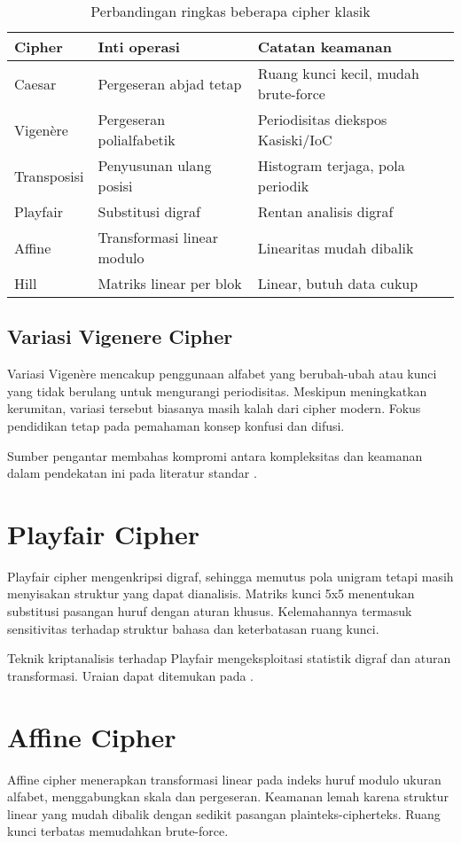 \documentclass[../main.tex]{subfiles}
\begin{document}
\begin{table}[h]
\centering
\caption{Perbandingan ringkas beberapa cipher klasik}
\label{tab:klasik}
\begin{tabular}{lll}
\toprule
Cipher & Inti operasi & Catatan keamanan \\
\midrule
Caesar & Pergeseran abjad tetap & Ruang kunci kecil, mudah brute-force \\
Vigenère & Pergeseran polialfabetik & Periodisitas diekspos Kasiski/IoC \parencite{friedman1922ioc} \\
Transposisi & Penyusunan ulang posisi & Histogram terjaga, pola periodik \\
Playfair & Substitusi digraf & Rentan analisis digraf \\
Affine & Transformasi linear modulo & Linearitas mudah dibalik \\
Hill & Matriks linear per blok & Linear, butuh data cukup \\
\bottomrule
\end{tabular}
\end{table}

\subsection{Variasi Vigenere Cipher}
Variasi Vigenère mencakup penggunaan alfabet yang berubah-ubah atau kunci yang tidak berulang untuk mengurangi periodisitas. Meskipun meningkatkan kerumitan, variasi tersebut biasanya masih kalah dari cipher modern. Fokus pendidikan tetap pada pemahaman konsep konfusi dan difusi.

Sumber pengantar membahas kompromi antara kompleksitas dan keamanan dalam pendekatan ini pada literatur standar \parencite{menezes1996handbook}.

\section{Playfair Cipher}
Playfair cipher mengenkripsi digraf, sehingga memutus pola unigram tetapi masih menyisakan struktur yang dapat dianalisis. Matriks kunci 5x5 menentukan substitusi pasangan huruf dengan aturan khusus. Kelemahannya termasuk sensitivitas terhadap struktur bahasa dan keterbatasan ruang kunci.

Teknik kriptanalisis terhadap Playfair mengeksploitasi statistik digraf dan aturan transformasi. Uraian dapat ditemukan pada \textcite{menezes1996handbook}.

\section{Affine Cipher}
Affine cipher menerapkan transformasi linear pada indeks huruf modulo ukuran alfabet, menggabungkan skala dan pergeseran. Keamanan lemah karena struktur linear yang mudah dibalik dengan sedikit pasangan plainteks-cipherteks. Ruang kunci terbatas memudahkan brute-force.
\end{document}
